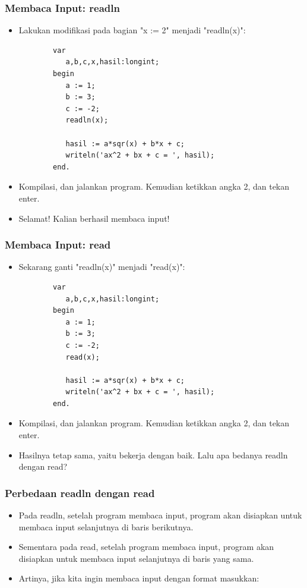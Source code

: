 \documentclass{beamer}
\begin{document}
\begin{frame}[fragile]
\frametitle{Membaca Input: readln}
\begin{itemize}
	\item Lakukan modifikasi pada bagian "x := 2" menjadi "readln(x)":
	\begin{lstlisting}
		var
		   a,b,c,x,hasil:longint;
		begin
		   a := 1;
		   b := 3;
		   c := -2;
		   readln(x);
		
		   hasil := a*sqr(x) + b*x + c;
		   writeln('ax^2 + bx + c = ', hasil);
		end.
	\end{lstlisting}
	\item Kompilasi, dan jalankan program. Kemudian ketikkan angka 2, dan tekan enter.
	\item Selamat! Kalian berhasil membaca input!
\end{itemize}
\end{frame}

\begin{frame}[fragile]
\frametitle{Membaca Input: read}
\begin{itemize}
	\item Sekarang ganti "readln(x)" menjadi "read(x)":
	\begin{lstlisting}
		var
		   a,b,c,x,hasil:longint;
		begin
		   a := 1;
		   b := 3;
		   c := -2;
		   read(x);
		
		   hasil := a*sqr(x) + b*x + c;
		   writeln('ax^2 + bx + c = ', hasil);
		end.
	\end{lstlisting}
	\item Kompilasi, dan jalankan program. Kemudian ketikkan angka 2, dan tekan enter.
	\item Hasilnya tetap sama, yaitu bekerja dengan baik. Lalu apa bedanya readln dengan read?
\end{itemize}
\end{frame}

\begin{frame}[fragile]
\frametitle{Perbedaan readln dengan read}
\begin{itemize}
	\item Pada readln, setelah program membaca input, program akan disiapkan untuk membaca input selanjutnya di \alert{baris berikutnya}.
	\item Sementara pada read, setelah program membaca input, program akan disiapkan untuk membaca input selanjutnya di \alert{baris yang sama}.
	\item Artinya, jika kita ingin membaca input dengan format masukkan:
\end{itemize}
\end{frame}
\end{document}
